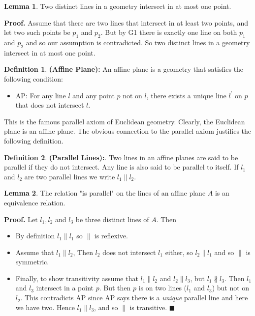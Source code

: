 \documentclass{article}
\theoremstyle{definition}
\newtheorem{definition}{Definition}[section]
\newtheorem{lemma}{Lemma}[section]
\begin{document}
\begin{lemma} Two distinct lines in a geometry intersect in at most one point.
\end{lemma}

\noindent
\textbf{Proof.} Assume that there are two lines that intersect in at least two points, and let two such points be $p_1$ and $p_2$. But by G1
there is exactly one line on both $p_1$ and $p_2$ and so our assumption is contradicted. So two distinct lines in a geometry intersect in at 
most one point.

\begin{definition} \textbf{(Affine Plane):}  An affine plane is a geometry that satisfies the following condition: 
\begin{itemize}
\item AP: For any line $l$ and any point $p$ not on $l$, there exists a unique line $l^\prime$ on $p$ that does not intersect $l$.
\end{itemize}
This is the famous parallel axiom of Euclidean geometry. Clearly, the Euclidean plane is an affine plane. The obvious connection to the
 parallel axiom justifies the following definition.
\end{definition}

\begin{definition}  \textbf{(Parallel Lines):}. Two lines in an affine planes are said to be parallel if they do not intersect. Any line is also said to be parallel to itself.
If $l_1$ and $l_2$ are two parallel lines we write $l_1 \parallel l_2$.
\end{definition}

\begin{lemma} The relation "is parallel" on the lines of an affine plane $A$ is an equivalence relation.
\end{lemma}

\noindent
\textbf{Proof.}  Let $l_1,l_2$ and $l_3$ be three distinct lines of $A$. Then

\begin{itemize}
\item By definition $l_1 \parallel l_1$ so $\parallel$ is reflexive. 
\item Assume that $l_1 \parallel l_2$, Then $l_2$ does not intersect $l_1$ either, so $l_2 \parallel l_1$ and so $\parallel$  is symmetric. 
\item Finally, to show transitivity  assume that $l_1 \parallel l_2$ 
and $l_2 \parallel l_3$, but $l_1 \nparallel l_3$. Then $l_1$ and $l_3$ intersect in a point $p$. But then $p$ is on two lines ($l_1$ and $l_3$) but not on $l_2$.
This contradicts AP since AP says there is a \emph{unique} parallel line and here we have two. Hence  $l_1 \parallel l_3$, and so $\parallel$  is transitive. 
$\blacksquare$
\end{itemize}
\end{document}
